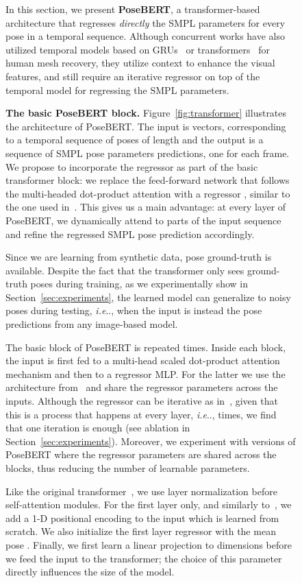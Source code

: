 \documentclass[10pt,twocolumn,letterpaper]{article}
\makeatletter
\newcommand{\smpltransformer}{PoseBERT\xspace}
\DeclareRobustCommand\onedot{\futurelet\@let@token\@onedot}
\def\@onedot{\ifx\@let@token.\else.\null\fi\xspace}
\def\ie{\emph{i.e}\onedot} \def\Ie{\emph{I.e}\onedot}
\renewcommand{\paragraph}[1]{\vspace{0.02cm}\noindent\textbf{#1}}
\makeatother
\begin{document}
\begin{figure}
In this section, we present \textbf{\smpltransformer}, a transformer-based architecture that regresses \emph{directly} the SMPL parameters for every pose in a temporal sequence. Although concurrent works have also utilized temporal models based on GRUs~\cite{vibe,meva,tcmr} or transformers~\cite{thmmr} for human mesh recovery, they utilize context to enhance the visual features, and still require an iterative regressor on top of the temporal model for regressing the SMPL parameters. 

\paragraph{The basic \smpltransformer block.}
Figure~\ref{fig:transformer} illustrates the architecture of \smpltransformer. The input is  vectors, corresponding to a temporal sequence of poses of length  and the output is a sequence of SMPL pose parameters predictions, one for each frame. 
We propose to incorporate the regressor as part of the basic transformer block: we replace the feed-forward network that follows the multi-headed dot-product attention with a regressor , similar to the one used in~\cite{hmr}. This gives us a main advantage: at every layer of \smpltransformer, we dynamically attend to parts of the input sequence and refine the regressed SMPL pose prediction accordingly.

Since we are learning from synthetic data, pose ground-truth is available. 
Despite the fact that the transformer only sees ground-truth poses during training, as we experimentally show in Section~\ref{sec:experiments}, the learned model can generalize to noisy poses during testing, \ie, when the input is instead the pose predictions from any image-based model. 


The basic block of \smpltransformer is repeated  times. 
Inside each block, the input is first fed to a multi-head scaled dot-product attention mechanism and then to a regressor MLP. For the latter we use the architecture from~\cite{hmr} and share the regressor parameters across the  inputs.  Although the regressor can be iterative as in~\cite{hmr}, given that this is a process that happens at every layer, \ie,  times, we find that one iteration is enough (see ablation in Section~\ref{sec:experiments}). Moreover, we experiment with versions of \smpltransformer where the regressor parameters are shared across the  blocks, thus reducing the number of learnable parameters.

Like the original transformer~\cite{transformer}, we use layer normalization before self-attention modules. For the first layer only, and similarly to~\cite{transformer}, we add a 1-D positional encoding to the input which is learned from scratch. We also initialize the first layer regressor with the mean pose . Finally, we first learn a linear projection to  dimensions before we feed the input to the transformer; the choice of this parameter directly influences the size of the model.




\end{figure}
\end{document}
